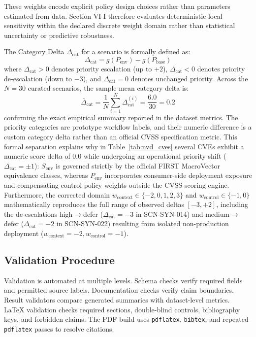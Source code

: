 \documentclass[conference]{IEEEtran}
\begin{document}
These weights encode explicit policy design choices rather than parameters estimated from data. Section VI-I therefore evaluates deterministic local sensitivity within the declared discrete weight domain rather than statistical uncertainty or predictive robustness.

The Category Delta $\Delta_{\text{cat}}$ for a scenario is formally defined as:
\begin{equation}
\Delta_{\text{cat}} = g(P_{\text{env}}) - g(P_{\text{base}})
\end{equation}
where $\Delta_{\text{cat}} > 0$ denotes priority escalation (up to $+2$),
$\Delta_{\text{cat}} < 0$ denotes priority de-escalation (down to $-3$), and
$\Delta_{\text{cat}} = 0$ denotes unchanged priority. Across the $N=30$ curated scenarios,
the sample mean category delta is:
\begin{equation}
\bar{\Delta}_{\text{cat}} = \frac{1}{N} \sum_{i=1}^N \Delta_{\text{cat}}^{(i)} = \frac{6.0}{30} = 0.2
\end{equation}
confirming the exact empirical summary reported in the dataset metrics. The priority categories are prototype workflow labels, and their numeric difference is a custom category delta rather than an official CVSS specification metric. This formal separation explains why in Table~\ref{tab:nvd_cves} several CVEs exhibit a numeric score delta of $0.0$ while undergoing an operational priority shift ($\Delta_{\text{cat}} = \pm 1$): $S_{\text{env}}$ is governed strictly by the official FIRST MacroVector equivalence classes, whereas $P_{\text{env}}$ incorporates consumer-side deployment exposure and compensating control policy weights outside the CVSS scoring engine. Furthermore, the corrected domain $w_{\text{context}} \in \{-2, 0, 1, 2, 3\}$ and $w_{\text{control}} \in \{-1, 0\}$ mathematically reproduces the full range of observed deltas $[-3, +2]$, including the de-escalations high$\to$defer ($\Delta_{\text{cat}} = -3$ in SCN-SYN-014) and medium$\to$defer ($\Delta_{\text{cat}} = -2$ in SCN-SYN-022) resulting from isolated non-production deployment ($w_{\text{context}} = -2, w_{\text{control}} = -1$).

\subsection{Validation Procedure}

Validation is automated at multiple levels. Schema checks verify required
fields and permitted source labels. Documentation checks verify claim
boundaries. Result validators compare generated summaries with dataset-level
metrics. LaTeX validation checks required sections, double-blind controls,
bibliography keys, and forbidden claims. The PDF build uses
\texttt{pdflatex}, \texttt{bibtex}, and repeated \texttt{pdflatex} passes to
resolve citations.
\end{document}
